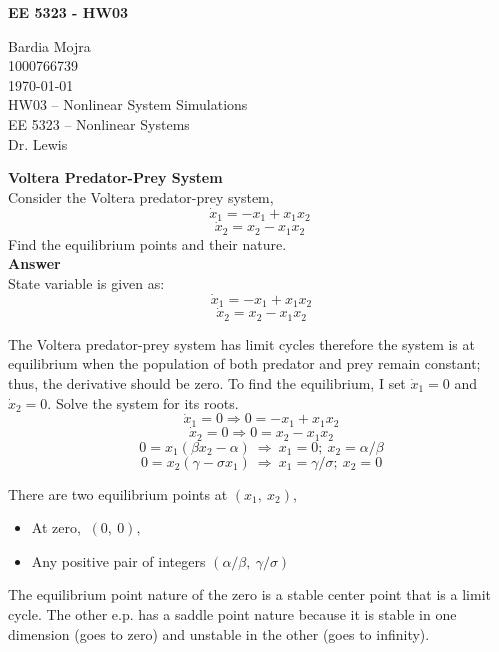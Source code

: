 \documentclass{homeworg}
\begin{document}
\begin{center}
\textbf{EE 5323 - HW03}\\
\end{center}

\noindent
Bardia Mojra\\
1000766739\\
\today\\
HW03 -- Nonlinear System Simulations\\
EE 5323 -- Nonlinear Systems\\
Dr. Lewis

\exercise
\noindent
\textbf{Voltera Predator-Prey System} \\
Consider the Voltera predator-prey system,\\
$$
\dot{x}_1 = - x_1 + x_1 x_2
$$
$$
\dot{x}_2 = x_2 -  x_1 x_2
$$
Find the equilibrium points and their nature.\\

\noindent
\textbf{Answer} \\
State variable is given as:
$$
~\dot{x}_1 = - x_1 + x_1 x_2
$$
$$
~\dot{x}_2 = x_2 -  x_1 x_2
$$

The Voltera predator-prey system has limit cycles therefore the system is
at equilibrium when the population of both predator and prey remain
constant; thus, the derivative should be zero.
To find the equilibrium, I set $\dot{x}_{1}=0$ and $\dot{x}_{2}=0$.
Solve the system for its roots.\\

$$
~\dot{x}_1 = 0 \Rightarrow 0 =  - x_1 + x_1 x_2
$$
$$
~\dot{x}_2 = 0 \Rightarrow 0 = x_2 -  x_1 x_2
$$
$$
~0 = x_1 (\beta x_2 - \alpha)~\Rightarrow~x_1 = 0 ; ~x_2 = \alpha/\beta
$$
$$~0 = x_2 (\gamma - \sigma x_1)~\Rightarrow~x_1 = \gamma/\sigma ; ~x_2 = 0
$$

There are two equilibrium points at $(x_1,~x_2)$,

\begin{itemize}
  \item At zero, $~(0 ,~ 0),$
  \item Any positive pair of integers $(\alpha/\beta,~\gamma/\sigma)$
\end{itemize}

The equilibrium point nature of the zero is a stable center point that is a
limit cycle. The other e.p. has a saddle point nature because it is stable
in one dimension (goes to zero) and unstable in the other (goes to
infinity).
\end{document}
